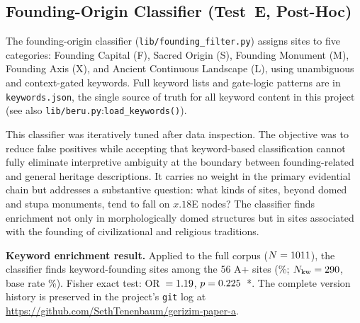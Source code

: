 \documentclass[12pt,a4paper]{article}
\begin{document}
\subsection{Founding-Origin Classifier (Test~E, Post-Hoc)}
\label{sec:kwdaudit_founding}

The founding-origin classifier (\texttt{lib/founding\_filter.py})
assigns sites to five categories: Founding Capital (F), Sacred Origin
(S), Founding Monument (M), Founding Axis (X), and Ancient Continuous
Landscape (L), using unambiguous and context-gated keywords. Full
keyword lists and gate-logic patterns are in \texttt{keywords.json},
the single source of truth for all keyword content in this project
(see also \texttt{lib/beru.py}:\texttt{load\_keywords()}).

This classifier was iteratively tuned after data inspection. The
objective was to reduce false positives while accepting that keyword-based
classification cannot fully eliminate interpretive ambiguity at
the boundary between founding-related and general heritage
descriptions. It carries no weight in the primary evidential
chain but addresses a substantive question: what kinds of sites,
beyond domed and stupa monuments, tend to fall on $x.18$\textdegree{}E
nodes? The classifier finds enrichment not only in morphologically
domed structures but in sites associated with the founding of
civilizational and religious traditions.

\textbf{Keyword enrichment result.}
Applied to the full corpus ($N = 1011$), the classifier finds
\NfoundKwAp{} keyword-founding sites among the 56 A+ sites
(\foundKwApRate\%; $N_{\mathrm{kw}} = 290$, base rate
\foundKwBaseRate\%). Fisher exact test: OR~$= 1.19$,
$p = 0.225$~*. The complete version history is preserved in
the project's \texttt{git} log at
\url{https://github.com/SethTenenbaum/gerizim-paper-a}.



\end{document}
